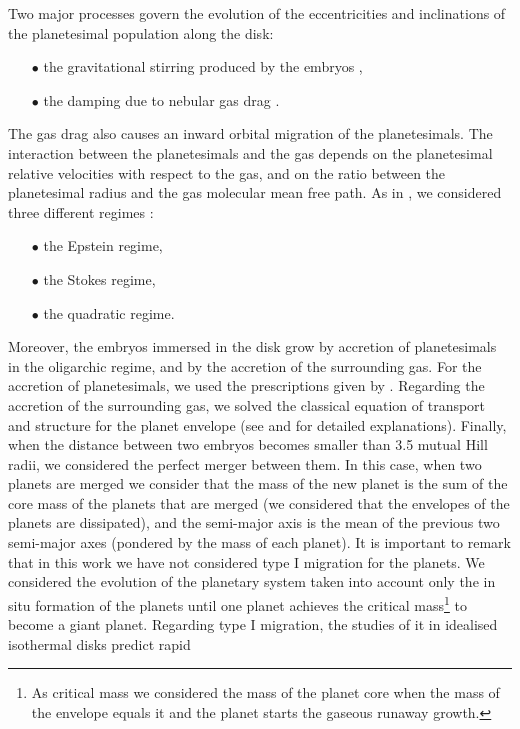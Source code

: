 \documentclass{aa}
\begin{document}
Two major processes govern the evolution of the eccentricities and inclinations of the planetesimal population along the disk:
\begin{itemize}
\item[$\bullet$] the gravitational stirring produced by the embryos \citep{Ohtsuki2002},
\item[$\bullet$] the damping due to nebular gas drag \citep{Rafikov2004,Chambers2008}.
\end{itemize}
The gas drag also causes an inward orbital migration of the planetesimals. The interaction between the planetesimals and the gas
depends on the planetesimal relative velocities with respect to the gas, and on the ratio between the planetesimal radius and the gas
molecular mean free path. As in \citet{Guilera2014}, we considered three different regimes \citep{Rafikov2004,Chambers2008}:
\begin{itemize}
\item[$\bullet$] the Epstein regime,
\item[$\bullet$] the Stokes regime,
\item[$\bullet$] the quadratic regime.
\end{itemize}
Moreover, the embryos immersed in the disk grow by accretion of planetesimals in the oligarchic regime, and by the accretion of
the surrounding gas. For the accretion of planetesimals, we used the prescriptions given by \citet{Inaba2001}. Regarding the
accretion of the surrounding gas, we solved the classical equation of transport and structure for the planet envelope (see \citet{Fortier2009} and \citet{Guilera2010} for detailed explanations). Finally, when the distance between two
embryos becomes smaller than
3.5 mutual Hill radii, we considered the perfect merger between them. In this case, when two planets are merged we consider that
the mass of the new planet is the sum of the core mass of the planets that are merged (we considered that the envelopes of the
planets are dissipated), and the semi-major axis is the mean of the previous two semi-major axes (pondered by the mass of each planet).
It is important to remark that in this work we have not considered type I migration for the planets. We considered the evolution of the
planetary system taken into account only the in situ formation of the planets until one planet achieves the critical mass\footnote{As
critical mass we considered the mass of the planet core when the mass of the envelope equals it and the planet starts the gaseous
runaway growth.} to become a giant planet. Regarding type I migration, the studies of it in idealised isothermal disks predict rapid
\end{document}
